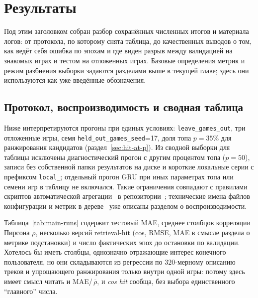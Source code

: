 \section{Результаты}

Под этим заголовком собран разбор сохранённых численных итогов и материала логов: от протокола, по которому снята таблица, до качественных выводов о том, как ведёт себя ошибка по эпохам и где виден разрыв между валидацией на знакомых играх и тестом на отложенных играх. Базовые определения метрик и режим разбиения выборки задаются разделами выше в текущей главе; здесь они используются как уже введённые обозначения.

\subsection{Протокол, воспроизводимость и сводная таблица}

Ниже интерпретируются прогоны при единых условиях: \texttt{leave\_games\_out}, три отложенные игры, семя \texttt{held\_out\_games\_seed}=17, доля топа $p=35$\% для ранжирования кандидатов (раздел~\ref{sec:hit-at-p}). Из сводной выборки для таблицы исключены диагностический прогон с другим процентом топа ($p=50$), записи без собственной папки результатов на диске и короткие локальные серии с префиксом \texttt{local\_}; отдельный прогон GRU при иных параметрах топа или семени игр в таблицу не включался. Такие ограничения совпадают с правилами скриптов автоматической агрегации~ в репозитории~; технические имена файлов конфигурации и метрик в дереве~ уже описаны разделом о воспроизводимости.

Таблица~\ref{tab:main-runs} содержит тестовый MAE, среднее столбцов корреляции Пирсона $\overline{\rho}$, несколько версий retrieval-hit (cos, RMSE, MAE в смысле раздела о метрике подстановки) и число фактических эпох до остановки по валидации. Хотелось бы иметь столбцы, однозначно отражающие интерес конечного пользователя, но они складываются из регрессии по $320$-мерному описанию треков и упрощающего ранжирования только внутри одной игры: потому здесь имеет смысл читать и MAE/\,$\overline{\rho}$, и \textit{cos hit} сообща, без выбора единственного ``главного'' числа.

\begin{table}[H]
\centering
\caption{Тестовые метрики сохранённых прогонов (основной протокол).}
\label{tab:main-runs}
\footnotesize
\resizebox{\textwidth}{!}{}
\end{table}

